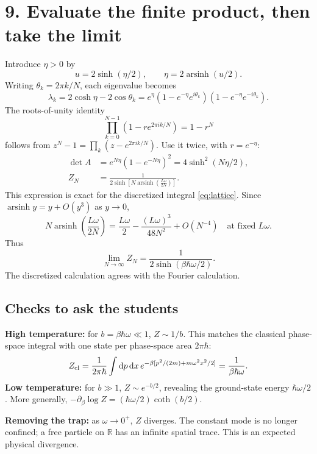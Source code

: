 \documentclass[11pt,letterpaper]{article}
\newcommand{\dd}{\mathrm{d}}
\newcommand{\asinh}{\operatorname{arsinh}}
\begin{document}
\newpage
\section*{9. Evaluate the finite product, then take the limit}
Introduce $\eta>0$ by
\[
 u=2\sinh(\eta/2),\qquad
 \eta=2\asinh(u/2).
\]
Writing $\theta_k=2\pi k/N$, each eigenvalue becomes
\[
 \lambda_k=2\cosh\eta-2\cos\theta_k
 =e^\eta(1-e^{-\eta}e^{i\theta_k})
             (1-e^{-\eta}e^{-i\theta_k}).
\]
The roots-of-unity identity
\[
 \prod_{k=0}^{N-1}(1-r e^{2\pi i k/N})=1-r^N
\]
follows from $z^N-1=\prod_k(z-e^{2\pi i k/N})$.
Use it twice, with $r=e^{-\eta}$:
\begin{align}
 \det A&=e^{N\eta}(1-e^{-N\eta})^2
       =4\sinh^2(N\eta/2),\\
 Z_N&=\boxed{\frac{1}{2\sinh\!\left[N\asinh\!\left(
                  \frac{L\omega}{2N}\right)\right]}}.
 \label{eq:finiteN}
\end{align}
This expression is exact for the discretized integral \eqref{eq:lattice}.
Since $\asinh y=y+O(y^3)$ as $y\to0$,
\[
 N\asinh\left(\frac{L\omega}{2N}\right)
 =\frac{L\omega}{2}-\frac{(L\omega)^3}{48N^2}+O(N^{-4})
 \quad\text{at fixed }L\omega.
\]
Thus
\begin{equation}
 \boxed{\lim_{N\to\infty}Z_N=
 \frac{1}{2\sinh(\beta\hbar\omega/2)}}.
\end{equation}
The discretized calculation agrees with the Fourier calculation.

\subsection*{Checks to ask the students}
\textbf{High temperature:} for $b=\beta\hbar\omega\ll1$,
$Z\sim1/b$. This matches the classical phase-space integral with one state
per phase-space area $2\pi\hbar$:
\[
 Z_{\rm cl}=\frac{1}{2\pi\hbar}\int\dd p\,\dd x\,
 e^{-\beta[p^2/(2m)+m\omega^2x^2/2]}
 =\frac{1}{\beta\hbar\omega}.
\]
\textbf{Low temperature:} for $b\gg1$, $Z\sim e^{-b/2}$, revealing the
ground-state energy $\hbar\omega/2$. More generally,
$-\partial_\beta\log Z=(\hbar\omega/2)\coth(b/2)$.

\textbf{Removing the trap:} as $\omega\to0^+$, $Z$ diverges.
The constant mode is no longer confined; a free particle on $\mathbb R$
has an infinite spatial trace. This is an expected physical divergence.
\end{document}
